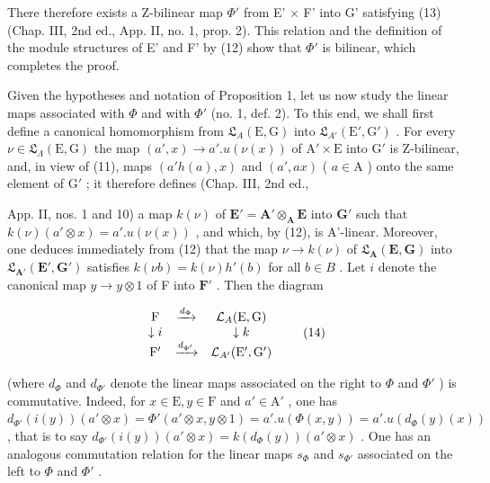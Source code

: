 There therefore exists a Z-bilinear map \(\Phi'\) from E' × F' into G' satisfying (13) (Chap. III, 2nd ed., App. II, no. 1, prop. 2). This relation and the definition of the module structures of E' and F' by (12) show that \(\Phi'\) is bilinear, which completes the proof.

Given the hypotheses and notation of Proposition 1, let us now study the linear maps associated with \(\Phi\) and with \(\Phi'\) (no. 1, def. 2). To this end, we shall first define a canonical homomorphism from \(\mathfrak{L}_{A}(\mathrm{E}, \mathrm{G})\) into \(\mathfrak{L}_{A'}(\mathrm{E}', \mathrm{G}')\) . For every \(\nu \in \mathfrak{L}_{\Lambda}(\mathrm{E}, \mathrm{G})\) the map \((a', x) \to a'. u(\nu(x))\) of \(\mathrm{A}' \times \mathrm{E}\) into \(\mathrm{G}'\) is Z-bilinear, and, in view of (11), maps \((a'h(a), x)\) and \((a', ax)\) ( \(a \in \mathrm{A}\) ) onto the same element of \(\mathrm{G}'\) ; it therefore defines (Chap. III, 2nd ed.,

App. II, nos. 1 and 10) a map \(k(\nu)\) of \(\mathbf{E}' = \mathbf{A}' \otimes_{\mathbf{A}} \mathbf{E}\) into \(\mathbf{G}'\) such that \(k(\nu)(a' \otimes x) = a'. u(\nu(x))\) , and which, by (12), is A'-linear. Moreover, one deduces immediately from (12) that the map \(\nu \to k(\nu)\) of \(\mathfrak{L}_{\mathbf{A}}(\mathbf{E}, \mathbf{G})\) into \(\mathfrak{L}_{\mathbf{A}'}(\mathbf{E}', \mathbf{G}')\) satisfies \(k(\nu b) = k(\nu) h'(b)\) for all \(b \in B\) . Let \(i\) denote the canonical map \(y \to y \otimes 1\) of F into \(\mathbf{F}'\) . Then the diagram

\[
\begin{array}{c c c} \mathrm{F} & \xrightarrow {d _ {\Phi}} & \mathcal {L} _ {A} (\mathrm{E}, \mathrm{G}) \\ \downarrow i & & \downarrow k \\ \mathrm{F} ^ {\prime} & \xrightarrow {d _ {\Phi^ {\prime}}} & \mathcal {L} _ {A^{\prime}} (\mathrm{E} ^ {\prime}, \mathrm{G} ^ {\prime}) \end{array}\tag{14}
\]

(where \(d_{\Phi}\) and \(d_{\Phi'}\) denote the linear maps associated on the right to \(\Phi\) and \(\Phi'\) ) is commutative. Indeed, for \(x \in \mathrm{E}, y \in \mathrm{F}\) and \(a' \in \mathrm{A}'\) , one has \(d_{\Phi'}(i(y))(a' \otimes x) = \Phi'(a' \otimes x, y \otimes 1) = a'. u(\Phi(x, y)) = a'. u(d_{\Phi}(y)(x))\) , that is to say \(d_{\Phi'}(i(y))(a' \otimes x) = k(d_{\Phi}(y))(a' \otimes x)\) . One has an analogous commutation relation for the linear maps \(s_{\Phi}\) and \(s_{\Phi'}\) associated on the left to \(\Phi\) and \(\Phi'\) .

